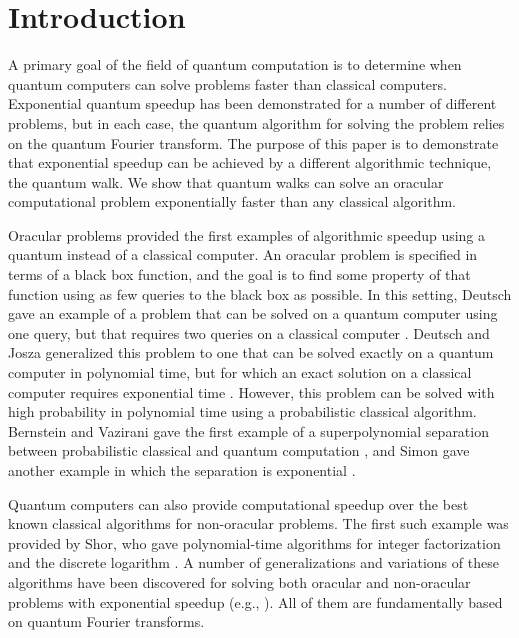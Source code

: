 \documentclass[aps,11pt,twoside,nofootinbib,tightenlines,superscriptaddress,preprintnumbers]{revtex4}
\newcommand{\<}{\langle}
\renewcommand{\>}{\rangle}
\begin{document}
\section{Introduction} \label{sec:intro}

A primary goal of the field of quantum computation is to determine when
quantum computers can solve problems faster than classical computers.
Exponential quantum speedup has been demonstrated for a number of
different problems, but in each case, the quantum algorithm for solving
the problem relies on the quantum Fourier transform.  The purpose of this
paper is to demonstrate that exponential speedup can be achieved by a
different algorithmic technique, the quantum walk.  We show that quantum
walks can solve an oracular computational problem exponentially
faster than any classical algorithm.

Oracular problems provided the first examples of algorithmic speedup using a
quantum instead of a classical computer.  An oracular problem is specified in
terms of a black box function, and the goal is to find some property of
that function using as few queries to the black box as possible.  In this
setting, Deutsch gave an example of a problem that can be solved on a
quantum computer using one query, but that requires two queries on a
classical computer \cite{Deu85}.  Deutsch and Josza generalized this
problem to one that can be solved exactly on a quantum computer in
polynomial time, but for which an exact solution on a classical computer
requires exponential time \cite{DJ92}.  However, this problem can be
solved with high probability in polynomial time using a probabilistic
classical algorithm.  Bernstein and Vazirani gave the first example of a
superpolynomial separation between probabilistic classical and quantum
computation \cite{BV93}, and Simon gave another example in which the
separation is exponential \cite{Sim94}.

Quantum computers can also provide computational speedup over the best
known classical algorithms for non-oracular problems.  The first such
example was provided by Shor, who gave polynomial-time algorithms for
integer factorization and the discrete logarithm \cite{Sho94}.  A number
of generalizations and variations of these algorithms have been discovered
for solving both oracular and non-oracular problems with exponential
speedup (e.g.,
\cite{Kit95,ME99,BCW00,DH00,HRT00,DHI01,GSVV01,IMS01,Wat01,Hal02}).
All of them are fundamentally based on quantum Fourier transforms.
\end{document}
